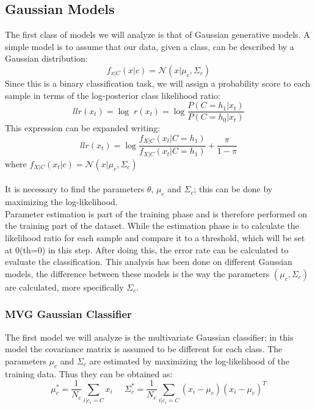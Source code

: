 \documentclass{article}
\begin{document}
\subsection{Gaussian Models}
The first class of models we will analyze is that of Gaussian generative models. A simple model is to assume that our data, given a class, can be described by a Gaussian distribution:
\begin{equation}
    f_{x|C}(x|c) = \mathcal{N}(x|\mu_c,\Sigma_c)
\end{equation}
Since this is a binary classification task, we will assign a probability score to each sample in terms of the log-posterior class likelihood ratio:
\begin{equation}
    llr(x_t) = \log \;r(x_t) = \log \frac{P(C=h_1|x_t)}{P(C=h_0|x_t)}
\end{equation}
This expression can be expanded writing:
\begin{equation}
    llr(x_t) = \log \frac{f_{X|C}(x_t|C=h_1)}{f_{X|C}(x_t|C=h_1)} + \frac{\pi }{1-\pi }
\end{equation}
where \( f_{X|C}(x_t|c)=\mathcal{N}(x|\mu_c,\Sigma_c)\)\\\\
It is necessary to find the parameters \(\theta \), \(\mu_c\) and \(\Sigma_c \); this can be done by maximizing the log-likelihood.\\ Parameter estimation is part of the training phase and is therefore performed on the training part of the dataset.
While the estimation phase is to calculate the likelihood ratio for each sample and compare it to a threshold, which will be set at 0(th=0) in this step. After doing this, the error rate can be calculated to evaluate the classification. 
This analysis has been done on different Gaussian models, the difference between these models is the way the parameters \((\mu_c ,\Sigma_c )\) are calculated, more specifically \(\Sigma_c\).
\subsubsection{MVG Gaussian Classifier}
The first model we will analyze is the multivariate Gaussian classifier; in this model the covariance matrix is assumed to be different for each class. The parameters \(\mu_c\) and \(\Sigma_c\) are estimated by maximizing the log-likelihood of the training data. Thus they can be obtained as:
\begin{equation}
    \mu_c^* = \frac{1}{N_c} \sum_{i|c_i=C} x_{i} \;\;\;\;\; \Sigma_c^* = \frac{1}{N_c} \sum_{i|c_i=C} (x_{i} - \mu_c)(x_{i} - \mu_c)^T
\end{equation}
\end{document}
